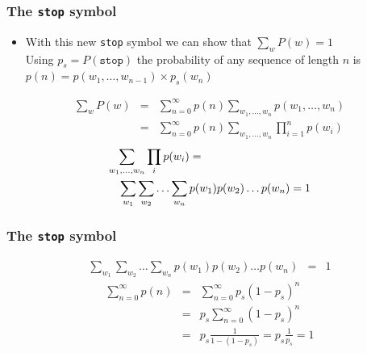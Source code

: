\begin{frame}
\frametitle{The {\tt stop} symbol}
\begin{itemize}[<+->]
\item With this new {\tt stop} symbol we can show that $\sum_w P(w) = 1$ \\
Using $p_s = P(\texttt{stop})$ the probability of any sequence of length $n$ is $p(n) = p(w_1, \ldots, w_{n-1}) \times p_s(w_n)$ \\
\end{itemize}
\begin{eqnarray*}
\sum_w P(w) &=& \sum_{n=0}^{\infty} p(n) \sum_{w_1, \ldots, w_n} p(w_1, \ldots, w_n) \\
&=& \sum_{n=0}^{\infty} p(n) \sum_{w_1, \ldots, w_n} \prod_{i=1}^n p(w_i)
\end{eqnarray*}
\begin{eqnarray*}
\lefteqn{\sum_{w_1, \ldots, w_n} \prod_i p(w_i) = } \\
&& \sum_{w_1} \sum_{w_2} \ldots \sum_{w_n} p(w_1) p(w_2) \ldots p(w_n) = 1
\end{eqnarray*}
\end{frame}

\begin{frame}
\frametitle{The {\tt stop} symbol}
\begin{eqnarray*}
\sum_{w_1} \sum_{w_2} \ldots \sum_{w_n} p(w_1) p(w_2) \ldots p(w_n) &=& 1
\end{eqnarray*}
\begin{eqnarray*}
\sum_{n=0}^\infty p(n) &=& \sum_{n=0}^\infty p_s(1 - p_s)^n \\
&=& p_s \sum_{n=0}^\infty (1 - p_s)^n \\
&=& p_s \frac{1}{1-(1-p_s)} = p_s \frac{1}{p_s} = 1
\end{eqnarray*}
\end{frame}




